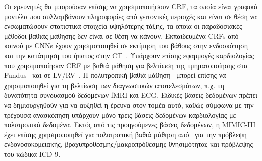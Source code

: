 Οι ερευνητές θα μπορούσαν επίσης να χρησιμοποιήσουν CRF, τα οποία είναι γραφικά μοντέλα που συλλαμβάνουν πληροφορίες από γειτονικές περιοχές και είναι σε θέση να ενσωματώσουν στατιστικά στοιχεία υψηλότερης τάξης, τα οποία οι παραδοσιακές μέθοδοι βαθιάς μάθησης δεν είναι σε θέση να κάνουν.
Εκπαιδευμένα CRFs από κοινού με CNNs έχουν χρησιμοποιηθεί σε εκτίμηση του βάθους στην ενδοσκόπηση~\cite{mahmood2018deep} και την κατάτμηση του ήπατος στην CT~\cite{christ2016automatic}.
Υπάρχουν επίσης εφαρμογές καρδιολογίας που χρησιμοποίησαν CRF με βαθιά μάθηση για βελτίωση της τμηματοποίησης στα Fundus~\cite{zhou2017improving} και σε LV/RV~\cite{bai2017semi}.
Η πολυτροπική βαθιά μάθηση~\cite{ngiam2011multimodal} μπορεί επίσης να χρησιμοποιηθεί για τη βελτίωση των διαγνωστικών αποτελεσμάτων, π.χ. τη δυνατότητα συνδυασμού δεδομένων fMRI και ECG\@.
Ειδικές βάσεις δεδομένων πρέπει να δημιουργηθούν για να αυξηθεί η έρευνα στον τομέα αυτό, καθώς σύμφωνα με την τρέχουσα ανασκόπηση υπάρχουν μόνο τρεις βάσεις δεδομένων καρδιολογίας με πολυτροπικά δεδομένα.
Εκτός από τις προηγούμενες βάσεις δεδομένων, η MIMIC-III έχει επίσης χρησιμοποιηθεί για πολυτροπική βαθιά μάθηση από~\cite{purushotham2018benchmarking} για την πρόβλεψη ενδονοσοκομειακής, βραχυπρόθεσμης/μακροπρόθεσμης θνησιμότητας και πρόβλεψης του κώδικα ICD-9.

\clearpage


